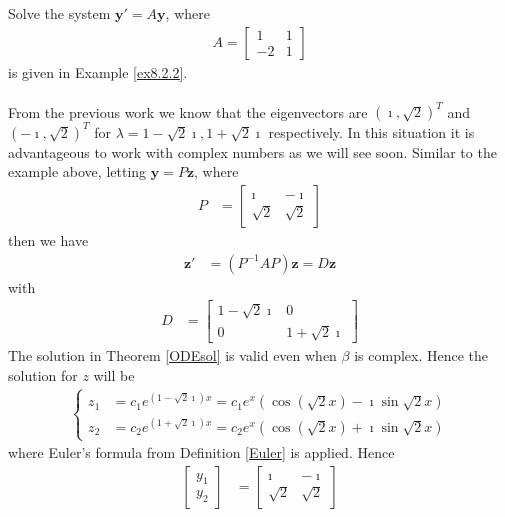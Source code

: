 \begin{exmp}
Solve the system $\textbf{y}' = A\textbf{y}$, where
\begin{align*}
A = 
\begin{bmatrix}
1 & 1 \\
-2 & 1
\end{bmatrix}    
\end{align*}
is given in Example \ref{ex8.2.2}.\\
\\
From the previous work we know that the eigenvectors are $(\imath,\sqrt{2})^T$ and $(-\imath,\sqrt{2})^T$ for $\lambda = 1-\sqrt{2}\imath, 1+\sqrt{2}\imath$ respectively. In this situation it is advantageous to work with complex numbers as we will see soon. Similar to the example above, letting $\textbf{y} = P\textbf{z}$, where
\begin{align*}
P &=
\begin{bmatrix}
\imath & -\imath \\
\sqrt{2} & \sqrt{2} 
\end{bmatrix}
\end{align*}
then we have
\begin{align*}
\textbf{z}' &= (P^{-1}AP)\textbf{z} = D\textbf{z}
\end{align*}
with 
\begin{align*}
D &=
\begin{bmatrix}
1 - \sqrt{2}\imath & 0 \\
0 & 1 + \sqrt{2}\imath
\end{bmatrix}
\end{align*}
The solution in Theorem \ref{ODEsol} is valid even when $\beta$ is complex. Hence the solution for $z$ will be
\begin{align*}
\begin{cases}
z_1 &= c_1e^{(1-\sqrt{2}\imath)x} = c_1e^{x}(\cos(\sqrt{2}x) - \imath\sin\sqrt{2}x)\\
z_2 &= c_2e^{(1+\sqrt{2}\imath)x} = c_2e^{x}(\cos(\sqrt{2}x) + \imath\sin\sqrt{2}x)
\end{cases}
\end{align*}
where Euler's formula from Definition \ref{Euler} is applied. Hence 
\begin{align*}
\begin{bmatrix}
y_1 \\
y_2
\end{bmatrix}
&=
\begin{bmatrix}
\imath & -\imath \\
\sqrt{2} & \sqrt{2} 
\end{bmatrix}

\end{align*}
\end{exmp}
